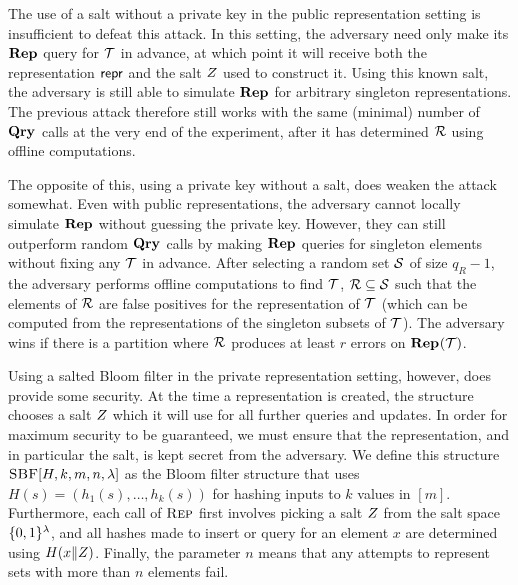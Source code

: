 The use of a salt without a private key in the public representation setting is
insufficient to defeat this attack. In this setting, the adversary need only
make its $\mathbf{Rep}\hspace{0.5pt}$ query for $\mathcal{T}$ in advance, at which point it will receive
both the representation $\mathsf{repr}$ and the salt $Z$ used to construct it. Using
this known salt, the adversary is still able to simulate $\mathbf{Rep}\hspace{0.5pt}$ for arbitrary
singleton representations. The previous attack therefore still works with the
same (minimal) number of $\mathbf{Qry}\hspace{0.5pt}$ calls at the very end of the experiment, after
it has determined $\mathcal{R}$ using offline computations.

The opposite of this, using a private key without a salt, does weaken the attack
somewhat. Even with public representations, the adversary cannot locally
simulate $\mathbf{Rep}\hspace{0.5pt}$ without guessing the private key. However, they can still
outperform random $\mathbf{Qry}\hspace{0.5pt}$ calls by making $\mathbf{Rep}\hspace{0.5pt}$ queries for singleton elements
without fixing any $\mathcal{T}$ in advance. After selecting a random set $\mathcal{S}$ of
size $q_R-1$, the adversary performs offline computations to find $\mathcal{T}$,
$\mathcal{R} \subseteq \mathcal{S}$ such that the elements of $\mathcal{R}$ are false positives for
the representation of $\mathcal{T}$ (which can be computed from the representations of
the singleton subsets of $\mathcal{T}$). The adversary wins if there is a partition
where $\mathcal{R}$ produces at least $r$ errors on $\mathbf{Rep}\hspace{0.5pt}(\mathcal{T})$.


Using a salted Bloom filter in the private representation setting, however, does
provide some security. At the time a representation is created, the structure
chooses a salt $Z$ which it will use for all further queries and updates. In
order for maximum security to be guaranteed, we must ensure that the
representation, and in particular the salt, is kept secret from the adversary.
We define this structure $\textnormal{\textsc{SBF}}[H,k,m,n,\lambda]$ as the Bloom filter structure
that uses $H(s) = (h_1(s),\ldots,h_k(s))$ for hashing inputs to $k$ values in
$[m]$. Furthermore, each call of $\textnormal{\textsc{Rep}}$ first involves picking a salt $Z$
from the salt space $\{0,1\}^\lambda$, and all hashes made to insert or query for
an element $x$ are determined using $H(x \Vert Z)$. Finally, the parameter
$n$ means that any attempts to represent sets with more than $n$ elements fail.

